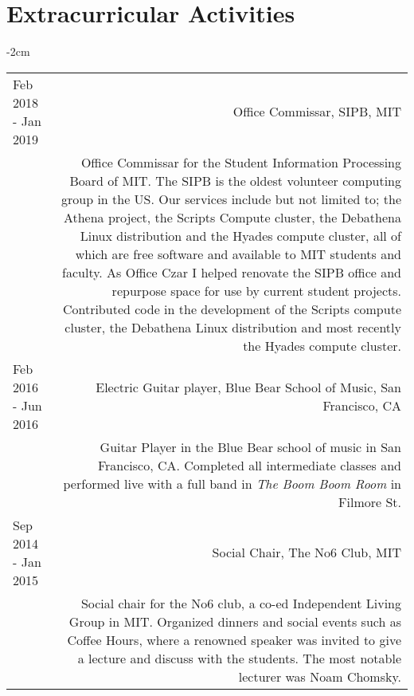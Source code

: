 \documentclass[lettersize,10pt]{article}
\begin{document}
\section{Extracurricular Activities}
\begin{adjustwidth}{}{-2cm}
  \begin{tabularx}{\textwidth}{L R}
    Feb 2018 - Jan 2019 & {\sc Office Commissar, SIPB, MIT} \\
	& Office Commissar for the Student Information Processing Board of MIT. The SIPB is the oldest volunteer computing group in the US.
    Our services include but not limited to; the Athena project, the Scripts Compute cluster, the Debathena Linux distribution and the
    Hyades compute cluster, all of which are free software and available to MIT students and faculty. As Office Czar I helped renovate
    the SIPB office and repurpose space for use by current student projects. Contributed code in the development of the Scripts compute
    cluster, the Debathena Linux distribution and most recently the Hyades compute cluster. \\
	Feb 2016 - Jun 2016 & {\sc Electric Guitar player, Blue Bear School of Music}, San Francisco, CA \\

    & Guitar Player in the Blue Bear school of music in San Francisco, CA. Completed all intermediate classes and performed live with a full
	  band in \emph{The Boom Boom Room} in Filmore St. \\
	Sep 2014 - Jan 2015 & {\sc Social Chair, The No6 Club, MIT} \\

    & Social chair for the No6 club, a co-ed Independent Living Group in MIT. Organized dinners and social events such as Coffee Hours,
    where a renowned speaker was invited to give a lecture and discuss with the students. The most notable lecturer was Noam Chomsky. \\
  \end{tabularx}
\end{adjustwidth}
\end{document}
